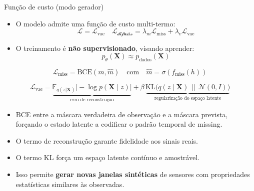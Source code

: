 \documentclass[10pt,aspectratio=169]{beamer}
\begin{document}
\begin{frame}{Função de custo (modo gerador)}
\small

\begin{itemize}
  \item O modelo admite uma função de custo multi-termo:
\[
\mathcal{L} =
\mathcal{L}_\text{vae} \quad
\mathcal{L_{\text{difusão}}} =
\lambda_m \mathcal{L}_{\text{miss}} 
+ \lambda_v \mathcal{L}_\text{vae}
\]
\end{itemize}

\vspace{0.2cm}

\begin{itemize}
  \item O treinamento é \textbf{não supervisionado}, visando aprender:
    \[
      p_\theta(\mathbf{X}) \approx p_{\text{dados}}(\mathbf{X})
    \]
\end{itemize}

\vspace{0.2cm}

\small

\[
\mathcal{L}_{\text{miss}} = \mathrm{BCE}(m,\hat{m})
\quad\text{com}\quad
\hat{m} = \sigma(f_{\text{miss}}(h))
\]


\[
\mathcal{L}_{\text{vae}}
=
\underbrace{
\mathbb{E}_{q(z|\mathbf{X})}
\big[
-\log p(\mathbf{X}\mid z)
\big]
}_{\text{erro de reconstrução}}
+
\beta\,
\underbrace{
\mathrm{KL}\big(q(z\mid\mathbf{X}) \,\|\, \mathcal{N}(0,I)\big)
}_{\text{regularização do espaço latente}}
\]

\vspace{0.2cm}

\begin{itemize}
   \item BCE entre a máscara verdadeira de observação e a máscara prevista,
forçando o estado latente a codificar o padrão temporal de missing.
  \item O termo de reconstrução garante fidelidade aos sinais reais.
  \item O termo KL força um espaço latente contínuo e amostrável.
  \item Isso permite \textbf{gerar novas janelas sintéticas} de sensores
        com propriedades estatísticas similares às observadas.
\end{itemize}

\end{frame}
\end{document}
